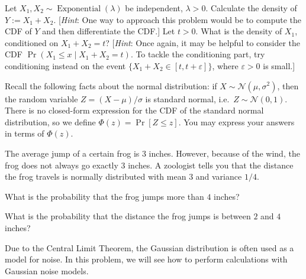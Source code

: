 
\begin{Parts}
    \Part Let $X_1, X_2 \sim \operatorname{Exponential}(\lambda)$ be independent, $\lambda > 0$.
    Calculate the density of $Y := X_1 + X_2$.
    [\textit{Hint}: One way to approach this problem would be to compute the CDF of $Y$ and then differentiate the CDF.]
    \Part Let $t > 0$.
    What is the density of $X_1$, conditioned on $X_1 + X_2 = t$?
    [\textit{Hint}: Once again, it may be helpful to consider the CDF $\Pr(X_1 \le x \mid X_1 + X_2 = t)$.
    To tackle the conditioning part, try conditioning instead on the event $\{X_1 + X_2 \in [t, t + \varepsilon]\}$, where $\varepsilon > 0$ is small.]
\end{Parts}



Recall the following facts about the normal distribution: if $X \sim \mathcal{N}(\mu, \sigma^2)$, then the random variable $Z = (X - \mu)/\sigma$ is standard normal, i.e.\ $Z \sim \mathcal{N}(0, 1)$. There is no closed-form expression for the CDF of the standard normal distribution, so we define $\Phi(z) = \Pr[Z \leq z]$. You may express your answers in terms of $\Phi(z)$.

The average jump of a certain frog is $3$ inches. However, because
of the wind, the frog does not always go exactly $3$ inches. A zoologist
tells you that the distance the frog travels is normally distributed
with mean $3$ and variance $1/4$. 

\begin{Parts}

\Part What is the probability that the frog jumps more than $4$ inches?
\nosolspace{1cm}

\Part What is the probability that the distance the frog jumps is between
$2$ and $4$ inches?
\nosolspace{1cm}

\end{Parts}



Due to the Central Limit Theorem, the Gaussian distribution is often used as a model for noise.
In this problem, we will see how to perform calculations with Gaussian noise models.


